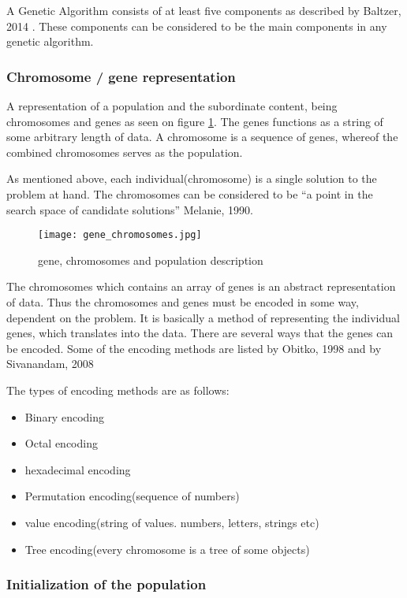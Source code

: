A Genetic Algorithm consists of at least five components as described by Baltzer, 2014 \cite{Baltzer2014}. These components can be considered to be the main components in any genetic algorithm.


\subsubsection*{Chromosome / gene representation}

A representation of a population and the subordinate content, being chromosomes and genes as seen on figure \ref{fig:gene}.
The genes functions as a string of some arbitrary length of data. A chromosome is a sequence of genes, whereof the combined chromosomes serves as the population. \cite[pp. 41]{Sivanandam2008}

As mentioned above, each individual(chromosome) is a single solution to the problem at hand. The chromosomes can be considered to be \enquote{a point in the search space of candidate solutions} \cite[pp. 7]{Melanie1990} Melanie, 1990.


\begin{figure}[!htbp]
\centering
\texttt{[image: gene\_chromosomes.jpg]}
\caption{gene, chromosomes and population description}
\label{fig:gene}
\end{figure}

The chromosomes which contains an array of genes is an abstract representation of data. Thus the chromosomes and genes must be encoded in some way, dependent on the problem. It is basically a method of representing the individual genes, which translates into the data.
There are several ways that the genes can be encoded. Some of the encoding methods are listed by Obitko, 1998 \cite{Marek1998} and by Sivanandam, 2008 \cite[pp.43]{Sivanandam2008}

The types of encoding methods are as follows:
\begin{itemize}
\item Binary encoding
\item Octal encoding
\item hexadecimal encoding
\item Permutation encoding(sequence of numbers)
\item value encoding(string of values. numbers, letters, strings etc)
\item Tree encoding(every chromosome is a tree of some objects)
\end{itemize}


\subsubsection*{Initialization of the population}

